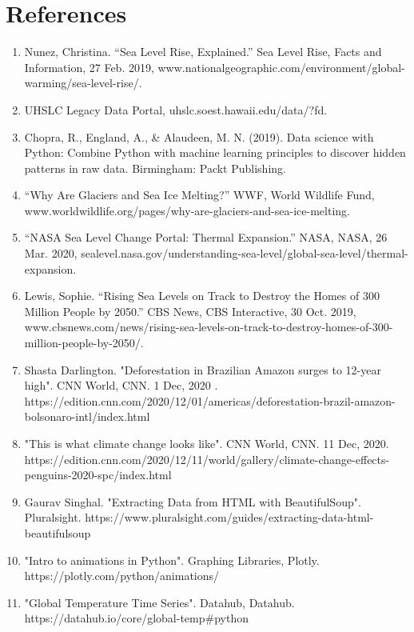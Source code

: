 \documentclass[fontsize=11pt]{article}
\begin{document}
    \section*{References}
    \begin{enumerate}
        \item
        Nunez, Christina. “Sea Level Rise, Explained.” Sea Level Rise, Facts and Information, 27 Feb. 2019, www.nationalgeographic.com/environment/global-warming/sea-level-rise/.
        \item
        UHSLC Legacy Data Portal, uhslc.soest.hawaii.edu/data/?fd.
        \item
        Chopra, R., England, A., \& Alaudeen, M. N. (2019). Data science with Python: Combine Python with machine learning principles to discover hidden patterns in raw data. Birmingham: Packt Publishing.
        \item
        “Why Are Glaciers and Sea Ice Melting?” WWF, World Wildlife Fund, www.worldwildlife.org/pages/why-are-glaciers-and-sea-ice-melting.
        \item
        “NASA Sea Level Change Portal: Thermal Expansion.” NASA, NASA, 26 Mar. 2020, sealevel.nasa.gov/understanding-sea-level/global-sea-level/thermal-expansion.
        \item
        Lewis, Sophie. “Rising Sea Levels on Track to Destroy the Homes of 300 Million People by 2050.” CBS News, CBS Interactive, 30 Oct. 2019, www.cbsnews.com/news/rising-sea-levels-on-track-to-destroy-homes-of-300-million-people-by-2050/.
        \item
        Shasta Darlington. "Deforestation in Brazilian Amazon surges to 12-year high". CNN World, CNN. 1 Dec, 2020 . https://edition.cnn.com/2020/12/01/americas/deforestation-brazil-amazon-bolsonaro-intl/index.html
        \item
        "This is what climate change looks like". CNN World, CNN. 11 Dec, 2020. https://edition.cnn.com/2020/12/11/world/gallery/climate-change-effects-penguins-2020-spc/index.html
        \item
        Gaurav Singhal. "Extracting Data from HTML with BeautifulSoup". Pluralsight. https://www.pluralsight.com/guides/extracting-data-html-beautifulsoup
        \item
        "Intro to animations in Python". Graphing Libraries, Plotly. https://plotly.com/python/animations/
        \item
        "Global Temperature Time Series". Datahub, Datahub.
        https://datahub.io/core/global-temp#python
    \end{enumerate}

\end{document}
